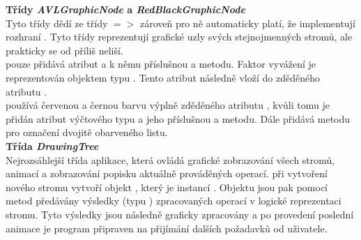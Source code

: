 \documentclass[
  biblatex=false,
  font=serif,
  glossaries=false,
  tables=false,
  theorems=false,
  index
]{kidiplom}
\begin{document}
\newpage
\noindent \textbf{Třídy \textit{AVLGraphicNode} a \textit{RedBlackGraphicNode}}\\
\indent Tyto třídy dědí ze třídy  $=>$ zároveň pro ně automaticky platí, že implementují rozhraní . Tyto třídy reprezentují grafické uzly svých stejnojmenných stromů, ale prakticky se od  příliš neliší. \\
\indent {} pouze přidává atribut  a k němu příslušnou  a  metodu. Faktor vyvážení je reprezentován objektem typu . Tento atribut následně vloží do zděděného atributu .\\ 
\indent {} používá červenou a černou barvu výplně zděděného atributu , kvůli tomu je přidán atribut  výčtového typu  a jeho příslušnou  a  metodu. Dále přidává metodu pro označení dvojitě obarveného listu.\\

\noindent \textbf{Třída \textit{DrawingTree}} \label{DrawingTree}\\
\indent Nejrozsáhlejší třída aplikace, která ovládá grafické zobrazování všech stromů, animací a zobrazování popisku aktuálně prováděných operací.  při vytvoření nového stromu vytvoří objekt , který je instancí . Objektu  jsou pak pomocí metod předávány výsledky (typu ) zpracovaných operací v logické reprezentaci stromu. Tyto výsledky jsou následně graficky zpracovány a po provedení poslední animace je program připraven na přijímání dalších požadavků od uživatele.\\
\end{document}
